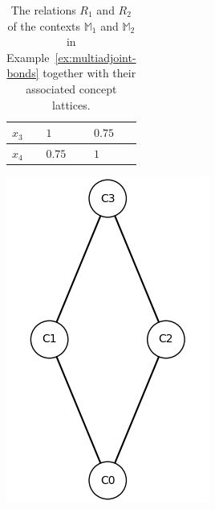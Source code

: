 \documentclass[runningheads,a4paper]{llncs}
\newcommand{\M}{\mathbb{M}}
\begin{document}
\begin{example}
\begin{table}[h]
\begin{minipage}{0.25\textwidth}
\begin{tabular}{w{c}{20pt} || w{c}{20pt} | w{c}{20pt}}
		$x_3$ & $1$ & $0.75$ \\\hline
		$x_4$ & $0.75$ & $1$
	\end{tabular}
	\end{minipage}
	\begin{minipage}{0.2\textwidth}
		\includegraphics[scale = 0.3]{im/ex-ma2-R2.png}
	\end{minipage}
	\caption{The relations $R_1$ and $R_2$ of the contexts $\M_1$ and $\M_2$ in Example~\ref{ex:multiadjoint-bonds} together with their associated concept lattices.}
	\label{tab:example1-multiadjoint-bonds-R1-R2}
	\vspace{-0.5cm}
\end{table}


\end{example}
\end{document}
